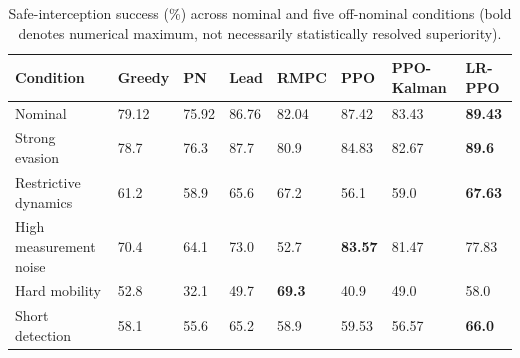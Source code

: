 \begin{table}[t]
\centering
\caption{Safe-interception success (\%) across nominal and five off-nominal conditions (bold denotes numerical maximum, not necessarily statistically resolved superiority).}
\label{tab:robustness_success}
\begin{tabular}{llllllll}
\hline
Condition & Greedy & PN & Lead & RMPC & PPO & PPO-Kalman & LR-PPO \\
\hline
Nominal & 79.12 & 75.92 & 86.76 & 82.04 & 87.42 & 83.43 & \textbf{89.43} \\
Strong evasion & 78.7 & 76.3 & 87.7 & 80.9 & 84.83 & 82.67 & \textbf{89.6} \\
Restrictive dynamics & 61.2 & 58.9 & 65.6 & 67.2 & 56.1 & 59.0 & \textbf{67.63} \\
High measurement noise & 70.4 & 64.1 & 73.0 & 52.7 & \textbf{83.57} & 81.47 & 77.83 \\
Hard mobility & 52.8 & 32.1 & 49.7 & \textbf{69.3} & 40.9 & 49.0 & 58.0 \\
Short detection & 58.1 & 55.6 & 65.2 & 58.9 & 59.53 & 56.57 & \textbf{66.0} \\
\hline
\end{tabular}
\end{table}
